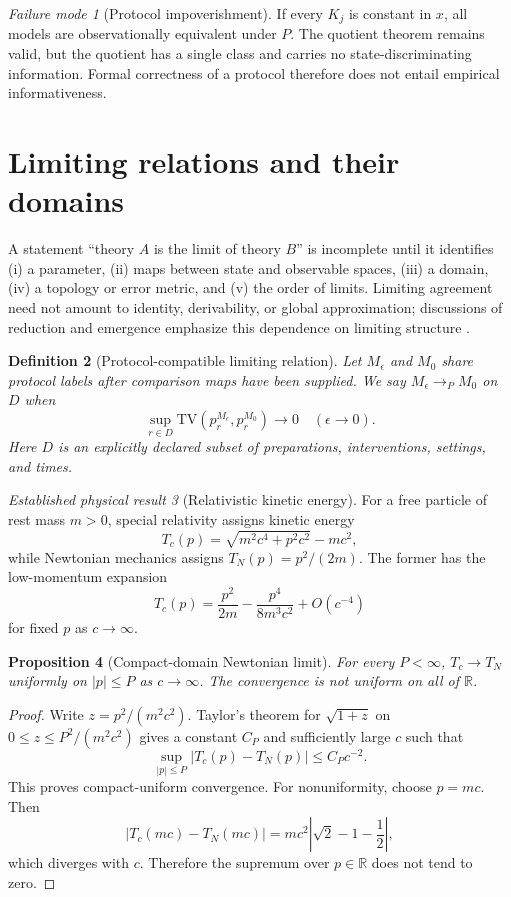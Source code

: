 \documentclass[11pt]{article}
\newtheorem{definition}{Definition}[section]
\newtheorem{proposition}[definition]{Proposition}
\theoremstyle{remark}
\newtheorem{established}[definition]{Established physical result}
\newtheorem{failuremode}[definition]{Failure mode}
\newcommand{\Real}{\mathbb{R}}
\newcommand{\TV}{\mathrm{TV}}
\begin{document}
\begin{failuremode}[Protocol impoverishment]
If every $K_j$ is constant in $x$, all models are observationally equivalent under $P$.  The quotient theorem remains valid, but the quotient has a single class and carries no state-discriminating information.  Formal correctness of a protocol therefore does not entail empirical informativeness.
\end{failuremode}

\section{Limiting relations and their domains}

A statement ``theory $A$ is the limit of theory $B$'' is incomplete until it identifies (i) a parameter, (ii) maps between state and observable spaces, (iii) a domain, (iv) a topology or error metric, and (v) the order of limits.  Limiting agreement need not amount to identity, derivability, or global approximation; discussions of reduction and emergence emphasize this dependence on limiting structure \cite{Butterfield2011a,Butterfield2011b}.

\begin{definition}[Protocol-compatible limiting relation]\label{def:limit}
Let $M_\epsilon$ and $M_0$ share protocol labels after comparison maps have been supplied.  We say $M_\epsilon\to_P M_0$ on $D$ when
\[
 \sup_{r\in D}\TV\!\left(p^{M_\epsilon}_r,p^{M_0}_r\right)\longrightarrow0
 \quad(\epsilon\to0).
\]
Here $D$ is an explicitly declared subset of preparations, interventions, settings, and times.
\end{definition}

\begin{established}[Relativistic kinetic energy]\label{est:rel}
For a free particle of rest mass $m>0$, special relativity assigns kinetic energy
\[
 T_c(p)=\sqrt{m^2c^4+p^2c^2}-mc^2,
\]
while Newtonian mechanics assigns $T_N(p)=p^2/(2m)$.  The former has the low-momentum expansion
\[
 T_c(p)=\frac{p^2}{2m}-\frac{p^4}{8m^3c^2}+O(c^{-4})
\]
for fixed $p$ as $c\to\infty$.
\end{established}

\begin{proposition}[Compact-domain Newtonian limit]\label{prop:rel-limit}
For every $P<\infty$, $T_c\to T_N$ uniformly on $|p|\leq P$ as $c\to\infty$.  The convergence is not uniform on all of $\Real$.
\end{proposition}
\begin{proof}
Write $z=p^2/(m^2c^2)$.  Taylor's theorem for $\sqrt{1+z}$ on $0\leq z\leq P^2/(m^2c^2)$ gives a constant $C_P$ and sufficiently large $c$ such that
\[
 \sup_{|p|\leq P}|T_c(p)-T_N(p)|\leq C_Pc^{-2}.
\]
This proves compact-uniform convergence.  For nonuniformity, choose $p=mc$.  Then
\[
 |T_c(mc)-T_N(mc)|=mc^2\left|\sqrt2-1-\frac12\right|,
\]
which diverges with $c$.  Therefore the supremum over $p\in\Real$ does not tend to zero.
\end{proof}
\end{document}
